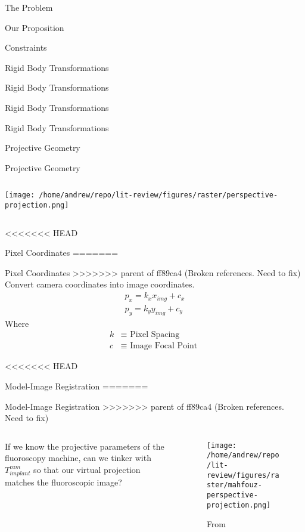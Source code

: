 \documentclass[presentation, aspectratio=1610]{beamer}
\begin{document}
\begin{frame}[label={sec:org51bdd62}]{The Problem}
\begin{frame}[label={sec:org827823c}]{Our Proposition}
\begin{frame}[label={sec:org8655799}]{Constraints}
\begin{frame}[label={sec:orgb624cd0}]{Rigid Body Transformations}
\begin{frame}[label={sec:org66cfa5c}]{Rigid Body Transformations}
\begin{frame}[label={sec:orga8040ec}]{Rigid Body Transformations}
\begin{frame}[label={sec:org2c45bb0}]{Rigid Body Transformations}
\begin{frame}[label={sec:orgc08b8a8}]{Projective Geometry}
\begin{frame}[label={sec:org540695f}]{Projective Geometry}
\begin{columns}
\begin{column}{0.6\columnwidth}
\begin{center}
\texttt{[image: /home/andrew/repo/lit-review/figures/raster/perspective-projection.png]}
\end{center}
\end{column}
\end{columns}
\end{frame}
<<<<<<< HEAD
\begin{frame}[label={sec:org9004faf}]{Pixel Coordinates}
=======
\begin{frame}[label={sec:orgd3693ce}]{Pixel Coordinates}
>>>>>>> parent of ff89ca4 (Broken references. Need to fix)
Convert camera coordinates into image coordinates.
\begin{equation*}
  \begin{aligned}
    p_{x} = k_{x}x_{img} + c_{x} \\
    p_{y} = k_{y}y_{img} + c_{y}
  \end{aligned}
\end{equation*}
Where
\begin{equation*}
  \begin{aligned}
    k &\equiv \text{ Pixel Spacing }\\
    c &\equiv \text{ Image Focal Point }
  \end{aligned}
\end{equation*}
\end{frame}

<<<<<<< HEAD
\begin{frame}[label={sec:orgf5a9f37}]{Model-Image Registration}
=======
\begin{frame}[label={sec:orgfd7ee34}]{Model-Image Registration}
>>>>>>> parent of ff89ca4 (Broken references. Need to fix)
\begin{columns}
\begin{column}{0.5\columnwidth}
If we know the projective parameters of the fluoroscopy machine, can we tinker with \(T^{cam}_{implant}\) so that our virtual projection matches the fluoroscopic image?
\end{column}
\begin{column}{0.6\columnwidth}
\begin{figure}[htbp]
\centering
\texttt{[image: /home/andrew/repo/lit-review/figures/raster/mahfouz-perspective-projection.png]}
\caption{From \autocite{mahfouzRobustMethodRegistration2003}}
\end{figure}
\end{column}
\end{columns}
\end{frame}

\end{frame}
\end{frame}
\end{frame}
\end{frame}
\end{frame}
\end{frame}
\end{frame}
\end{frame}
\end{frame}
\end{frame}
\end{document}
